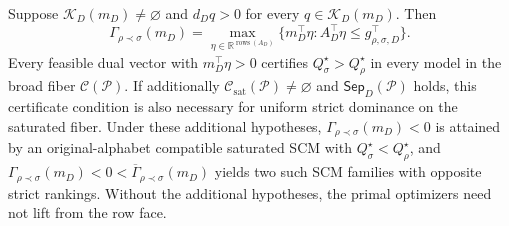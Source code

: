 Suppose \(\mathcal K_D(m_D)\ne\varnothing\) and \(d_Dq>0\) for every \(q\in\mathcal K_D(m_D)\). Then
\[
\Gamma_{\rho\prec\sigma}(m_D)=
\max_{\eta\in\mathbb R^{\operatorname{rows}(A_D)}}
\{m_D^\top\eta:A_D^\top\eta\le g_{\rho,\sigma,D}^\top\}.
\]
Every feasible dual vector with \(m_D^\top\eta>0\) certifies \(Q_\sigma^\star>Q_\rho^\star\) in every model in the broad fiber \(\mathcal C(\mathcal P)\). If additionally \(\mathcal C_{\mathrm{sat}}(\mathcal P)\ne\varnothing\) and \(\mathsf{Sep}_D(\mathcal P)\) holds, this certificate condition is also necessary for uniform strict dominance on the saturated fiber. Under these additional hypotheses, \(\Gamma_{\rho\prec\sigma}(m_D)<0\) is attained by an original-alphabet compatible saturated SCM with \(Q_\sigma^\star<Q_\rho^\star\), and \(\Gamma_{\rho\prec\sigma}(m_D)<0<\overline\Gamma_{\rho\prec\sigma}(m_D)\) yields two such SCM families with opposite strict rankings. Without the additional hypotheses, the primal optimizers need not lift from the row face.